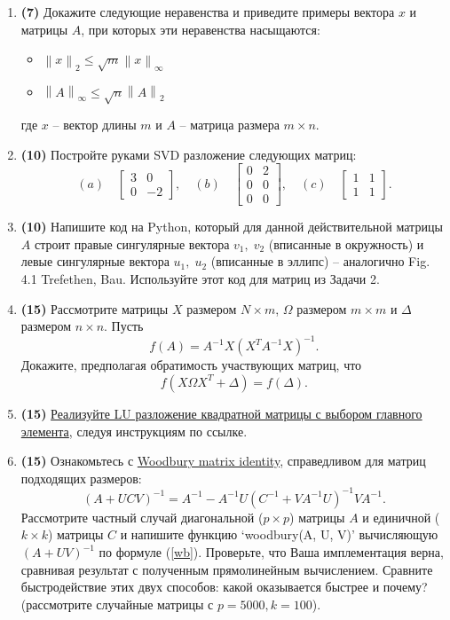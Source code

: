 \documentclass[10pt]{article}
\newcommand{\norm}[1]{\left\lVert#1\right\rVert}
\begin{document}
\begin{enumerate}
\item \textbf{(7)} Докажите следующие неравенства и приведите примеры вектора $x$ и матрицы $A$, при которых эти неравенства насыщаются:
\begin{itemize}
\item $\norm{x}_2 \le \sqrt{m}\norm{x}_\infty$
\item $\norm{A}_\infty \le \sqrt{n} \norm{A}_2$
\end{itemize}
где $x$ -- вектор длины $m$ и $A$ -- матрица размера $m\times n$.

\item \textbf{(10)} Постройте руками SVD разложение следующих матриц:
$$
(a)\quad\begin{bmatrix}
3 & 0\\
0 & -2
\end{bmatrix},\quad
(b)\quad\begin{bmatrix}
0 & 2\\
0 & 0\\
0 & 0
\end{bmatrix},\quad
(c)\quad\begin{bmatrix}
1 & 1\\
1 & 1
\end{bmatrix}.
$$

\item \textbf{(10)} Напишите код на Python, который для данной действительной матрицы $A$ строит правые сингулярные вектора $v_1,\; v_2$ (вписанные в окружность) и  левые сингулярные вектора $u_1,\; u_2$ (вписанные в эллипс) -- аналогично Fig. 4.1 Trefethen, Bau. Используйте этот код для матриц из Задачи 2.

\item \textbf{(15)} Рассмотрите матрицы $X$ размером $N\times m$, $ \Omega$ размером $m\times m$ и $ \Delta$ размером $n\times n$. Пусть
$$
f(A) = A^{-1}X(X^T A^{-1}X)^{-1}.
$$
Докажите, предполагая обратимость участвующих матриц, что $$f(X \Omega X^T + \Delta)=f(\Delta).$$

\item \textbf{(15)} \href{https://github.com/ev-br/CP2020/blob/master/week_1_LU_pivoting.ipynb}{Реализуйте LU разложение квадратной матрицы с выбором главного элемента}, следуя инструкциям по ссылке.

\item \textbf{(15)} Ознакомьтесь с \href{https://en.wikipedia.org/wiki/Woodbury_matrix_identity}{Woodbury matrix identity}, справедливом для матриц подходящих размеров:
\begin{equation}
\label{wb}
\left(A+UCV\right)^{-1}=A^{-1}-A^{-1}U\left(C^{-1}+VA^{-1}U\right)^{-1}VA^{-1}.
\end{equation}
Рассмотрите частный случай диагональной ($p\times p$) матрицы $A$ и единичной ($k\times k$) матрицы $C$ и напишите функцию `woodbury(A, U, V)' вычисляющую $\left(A+UV\right)^{-1}$ по формуле (\ref{wb}). Проверьте, что Ваша имплементация верна, сравнивая результат с полученным прямолинейным вычислением.
Сравните быстродействие этих двух способов: какой оказывается быстрее и почему? (рассмотрите случайные матрицы с $p = 5000, k = 100$).




\end{enumerate}
\end{document}
